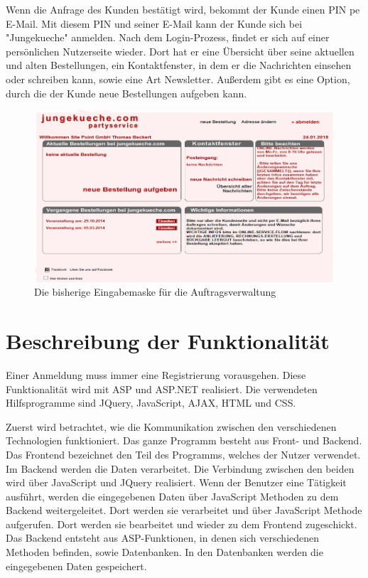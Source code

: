 Wenn die Anfrage des Kunden bestätigt wird, bekommt der Kunde einen PIN pe E-Mail. Mit diesem PIN und seiner E-Mail kann der Kunde sich bei "Jungekueche" anmelden. Nach dem Login-Prozess, findet er sich auf einer persönlichen Nutzerseite wieder. Dort hat er eine Übersicht über seine aktuellen und alten Bestellungen, ein Kontaktfenster, in dem er die Nachrichten einsehen oder schreiben kann, sowie eine Art Newsletter. Außerdem gibt es eine Option, durch die der Kunde neue Bestellungen aufgeben kann.  

\begin{figure}[h]
	\centering
	\includegraphics[width=0.7\linewidth]{Graphics/KundenAnsicht.png}
	\caption[Kundeansicht]{Die bisherige Eingabemaske für die Auftragsverwaltung}
	\label{fig:KundenAnsicht}
\end{figure}

\section{Beschreibung der Funktionalität}   

Einer Anmeldung muss immer eine Registrierung vorausgehen. Diese Funktionalität wird mit ASP und ASP.NET realisiert. Die verwendeten Hilfsprogramme sind JQuery, JavaScript, AJAX, HTML und CSS. 

Zuerst wird betrachtet, wie die Kommunikation zwischen den verschiedenen Technologien funktioniert. Das ganze Programm besteht aus Front- und Backend. Das Frontend bezeichnet den Teil des Programms, welches der Nutzer verwendet. Im Backend werden die Daten verarbeitet. Die Verbindung zwischen den beiden wird über JavaScript und JQuery realisiert. Wenn der Benutzer eine Tätigkeit ausführt, werden die eingegebenen Daten über JavaScript Methoden zu dem Backend weitergeleitet. Dort werden sie verarbeitet und über JavaScript Methode aufgerufen. Dort werden sie bearbeitet und wieder zu dem Frontend zugeschickt. Das Backend entsteht aus ASP-Funktionen, in denen sich verschiedenen Methoden befinden, sowie Datenbanken. In den Datenbanken werden die eingegebenen Daten gespeichert.


